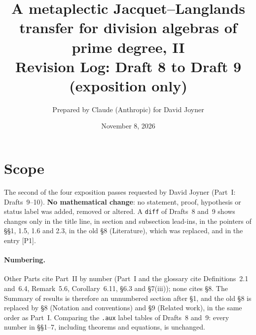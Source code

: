 \documentclass[11pt]{article}
\title{A metaplectic Jacquet--Langlands transfer for division algebras of prime degree, II\\
Revision Log: Draft 8 to Draft 9 (exposition only)}
\author{Prepared by Claude (Anthropic) for David Joyner}
\date{November 8, 2026}
\begin{document}
\maketitle

\section*{Scope}
The second of the four exposition passes requested by David Joyner
(Part~I: Drafts~9--10).  \textbf{No mathematical change}: no statement,
proof, hypothesis or status label was added, removed or altered.  A
\texttt{diff} of Drafts~8 and~9 shows changes only in the title line,
in section and subsection lead-ins, in the pointers of \S\S1, 1.5, 1.6
and 2.3, in the old \S8 (Literature), which was replaced, and in the
entry [P1].

\paragraph{Numbering.}  Other Parts cite Part~II by number (Part~I and
the glossary cite Definitions~2.1 and~6.4, Remark~5.6,
Corollary~6.11, \S6.3 and \S7(iii)); none cites \S8.  The Summary of
results is therefore an unnumbered section after \S1, and the old \S8
is replaced by \S8 (Notation and conventions) and \S9 (Related work),
in the same order as Part~I.  Comparing the \texttt{.aux} label tables
of Drafts~8 and~9: every number in \S\S1--7, including theorems and
equations, is unchanged.
\end{document}
